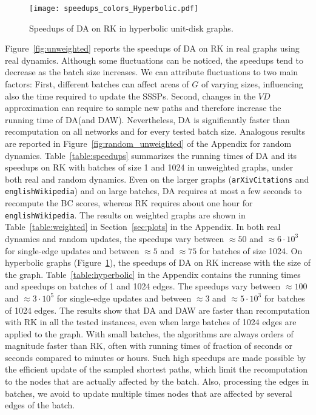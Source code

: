 \documentclass[english]{llncs}
\newcommand{\vd}{$\mathit{VD}$\xspace}
\newcommand{\rk}{\textsf{RK}\xspace}
\newcommand{\da}{\textsf{DA}\xspace}
\newcommand{\daw}{\textsf{DAW}\xspace}
\begin{document}
\begin{figure}[htb]
\begin{center}
\texttt{[image: speedups\_colors\_Hyperbolic.pdf]}
\caption{Speedups of \da on \rk in hyperbolic unit-disk graphs.}
\label{fig:hyp}
\end{center}
\end{figure}
Figure~\ref{fig:unweighted} reports the speedups of \da on \rk in real graphs using real dynamics. Although some fluctuations can be noticed, the speedups tend to decrease as the batch size increases. We can attribute fluctuations to two main factors: First, different batches can affect areas of $G$ of varying sizes, influencing also the time required to update the SSSPs. Second, changes in the \vd approximation can require to sample new paths and therefore increase the running time of \da (and \daw). Nevertheless, \da is significantly faster than recomputation on all networks and for every tested batch size. Analogous results are reported in Figure~\ref{fig:random_unweighted} of the Appendix for random dynamics. Table~\ref{table:speedups} summarizes the running times of \da and its speedups on \rk with batches of size 1 and 1024 in unweighted graphs, under both real and random dynamics. Even on the larger graphs (\texttt{arXivCitations} and \texttt{englishWikipedia}) and on large batches, \da requires at most a few seconds to recompute the BC scores, whereas \rk requires about one hour for \texttt{englishWikipedia}. 
The results on weighted graphs are shown in Table~\ref{table:weighted} in Section~\ref{sec:plots} in the Appendix. In both real dynamics and random updates, the speedups vary between $\approx 50$ and $\approx 6 \cdot 10^3$ for single-edge updates and between $\approx 5$ and $\approx 75$ for batches of size 1024.
On hyperbolic graphs (Figure~\ref{fig:hyp}), the speedups of \da on \rk increase with the size of the graph. Table~\ref{table:hyperbolic} in the Appendix contains the running times and speedups on batches of 1 and 1024 edges. The speedups vary between $\approx 100$ and $\approx 3 \cdot 10^5$ for single-edge updates and between $\approx 3$ and $\approx 5 \cdot 10^3$ for batches of 1024 edges. 
The results show that \da and \daw are faster than recomputation with \rk in all the tested instances, even when large batches of 1024 edges are applied to the graph. With small batches, the algorithms are always orders of magnitude faster than \rk, often with running times of fraction of seconds or seconds compared to minutes or hours. Such high speedups are made possible by the efficient update of the sampled shortest paths, which limit the recomputation to the nodes that are actually affected by the batch. Also, processing the edges in batches, we avoid to update multiple times nodes that are affected by several edges of the batch.
\end{document}
